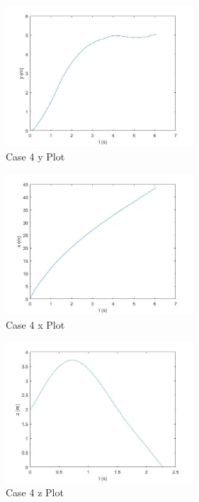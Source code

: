 \documentclass[12pt,twoside,letterpaper]{article}
\begin{document}
\begin{multicols}{3}

\begin{figure}[H]
\centering
\includegraphics[width=7cm]{figures/case_4_y.jpg}
\caption{Case 4 y Plot}
\label{Case 4 y Plot}

\end{figure}
\begin{figure}[H]
\centering
\includegraphics[width=7cm]{figures/case_4_x.jpg}
\caption{Case 4 x Plot}
\label{Case 4 x Plot}
\end{figure}
\begin{figure}[H]
\centering
\includegraphics[width=7cm]{figures/case_2_z.jpg}
\caption{Case 4 z Plot}
\label{Case 4 z Plot}
\end{figure}

\end{multicols}
\end{document}
